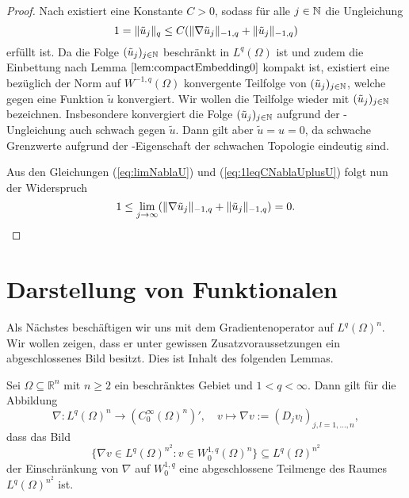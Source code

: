 \begin{proof}
  Nach \cite[S.45 Lemma 1.1.3]{sohr2001navier} existiert eine Konstante $C > 0$, sodass für alle $j \in \mathbb{N}$ die Ungleichung
  \begin{equation}
    \label{eq:1leqCNablaUplusU}
    1 = \lVert \tilde u_j \rVert_q \leq C (\lVert \nabla \tilde u_j \rVert_{-1,q} + \lVert \tilde u_j \rVert_{-1,q})
  \end{equation}
  erfüllt ist.
  Da die Folge $(\tilde u_j)_{j \in \mathbb{N}}$ beschränkt in $L^q(\Omega)$ ist und zudem die Einbettung nach Lemma $\ref{lem:compactEmbedding0}$ kompakt ist, existiert eine bezüglich der Norm auf $W^{-1,q}(\Omega)$ konvergente Teilfolge von $(\tilde u_j)_{j \in \mathbb{N}}$, welche gegen eine Funktion $\tilde u$ konvergiert. 
  Wir wollen die Teilfolge wieder mit $(\tilde u_j)_{j \in \mathbb{N}}$ bezeichnen.
  Insbesondere konvergiert die Folge $(\tilde u_j)_{j \in \mathbb{N}}$ aufgrund der \hoelder\hyp{}Ungleichung auch schwach gegen $\tilde u$.
  Dann gilt aber $\tilde u = u = 0$, da schwache Grenzwerte aufgrund der \hausdorff\hyp{}Eigenschaft der schwachen Topologie eindeutig sind.

  Aus den Gleichungen (\ref{eq:limNablaU}) und (\ref{eq:1leqCNablaUplusU}) folgt nun der Widerspruch
  \begin{displaymath}
  1 \leq \lim_{j \to \infty} ( \lVert \nabla \tilde u_j  \rVert_{-1,q} + \lVert \tilde u_j \rVert_{-1,q} ) = 0.\qedhere
  \end{displaymath}
  

\end{proof}

\newpage
\section{Darstellung von Funktionalen}

Als Nächstes beschäftigen wir uns mit dem Gradientenoperator auf $L^q(\Omega)^n$.
Wir wollen zeigen, dass er unter gewissen Zusatzvoraussetzungen ein abgeschlossenes Bild besitzt.
Dies ist Inhalt des folgenden Lemmas.

\begin{lem}
  \label{lem:closedImageGradient}
  Sei $\Omega \subseteq \mathbb{R}^n$ mit $n \geq 2$ ein beschränktes Gebiet und $1 < q < \infty$.
  Dann gilt für die Abbildung
  $$
  \nabla \colon L^{q}(\Omega)^{n} \to (C_0^\infty(\Omega)^n)',
  \quad v \mapsto \nabla v := (D_j v_l)_{j,l=1,\dots,n}, 
  $$
  dass das Bild
  $$
  \{\nabla v \in L^{q}(\Omega)^{n^2} \colon v \in W_0^{1,q}(\Omega)^n\} \subseteq L^{q}(\Omega)^{n^2}
  $$
  der Einschränkung von $\nabla$ auf $W_0^{1,q}$ eine abgeschlossene Teilmenge des Raumes $L^q(\Omega)^{n^2}$ ist.
\end{lem}

